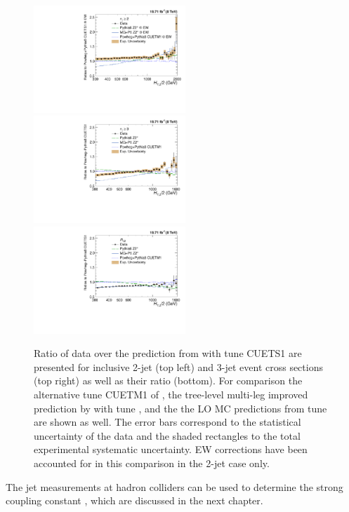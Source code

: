 \begin{figure}[!h]
 \begin{center}
 \hspace*{-5mm}\includegraphics[width=0.51\textwidth]{Plots_HT_2_150/Comparison_data_MC_samples_2_Pow_EW.pdf}%
 ~~\includegraphics[width=0.51\textwidth]{Plots_HT_2_150/Comparison_data_MC_samples_3_Pow.pdf}\\
 \includegraphics[width=0.51\textwidth]{Plots_HT_2_150/Comparison_data_MC_samples_ratio_32_Pow.pdf}\\
 \caption{Ratio of data over the prediction from \POWHEGn \plusn \PYTHIAE with tune CUETS1 are presented for inclusive 2-jet (top left) and 3-jet event cross sections (top right) as well as their ratio \ratio (bottom). For comparison the alternative tune CUETM1 of \POWHEGn \plusn \PYTHIAE, the tree-level multi-leg improved prediction by \MadGraphFn \plusn \PYTHIAS with tune \Ztwostar, and the the LO MC predictions from \PYTHIAS tune \Ztwostar are shown as well. The error bars correspond to the statistical uncertainty of the data and the shaded rectangles to the total experimental systematic uncertainty. EW corrections have been accounted for in this comparison in the 2-jet case only.}
 \label{fig:data_MC}
 \end{center}  
\end{figure}

The jet measurements at hadron colliders can be used to determine the strong coupling constant \alps, which are discussed in the next chapter.

